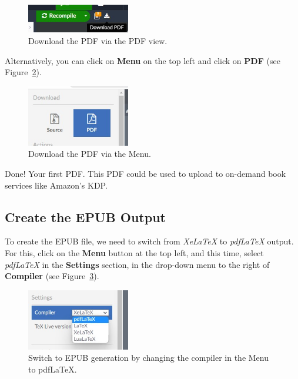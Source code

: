 \begin{figure}[H]\centering
\includegraphics[width=0.4\textwidth]{images/downloadPDF.jpg}
\caption{Download the PDF via the PDF view.}
\label{downloadpdf:fig}
\end{figure}


Alternatively, you can click on \textbf{Menu} on the top left and click on \textbf{PDF} (see Figure~\ref{downloadpdfmenu:fig}).

\begin{figure}[H]\centering
\includegraphics[width=0.4\textwidth]{images/downloadPDF2.jpg}
\caption{Download the PDF via the Menu.}
\label{downloadpdfmenu:fig}
\end{figure}

Done! Your first PDF. This PDF could be used to upload to on-demand book services like Amazon's KDP.


\subsection{Create the EPUB Output}\label{createhtmlloutput:sec}

To create the EPUB file, we need to switch from \textit{XeLaTeX} to \textit{pdfLaTeX} output. For this, click on the \textbf{Menu} button at the top left, and this time, select \textit{pdfLaTeX} in the \textbf{Settings} section, in the drop-down menu to the right of \textbf{Compiler} (see Figure~\ref{switchpdflatex:fig}).

\begin{figure}[H]\centering
\includegraphics[width=0.4\textwidth]{images/switchpdflatex.jpg}
\caption{Switch to EPUB generation by changing the compiler in the Menu to pdfLaTeX.}
\label{switchpdflatex:fig}
\end{figure}

